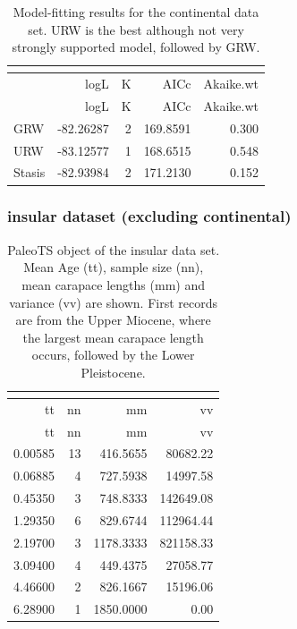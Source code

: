 \begin{longtable}[]{@{}lrrrr@{}}
	\caption[Model fits for continental data set]{Model-fitting results for the continental data set. URW is the best although not very strongly supported model, followed by GRW.}
	\label{tab:pTSCEM}\tabularnewline
	\toprule
	& logL & K & AICc & Akaike.wt\tabularnewline
	\midrule
	\endfirsthead
	\toprule
	& logL & K & AICc & Akaike.wt\tabularnewline
	\midrule
	\endhead
	GRW & -82.26287 & 2 & 169.8591 & 0.300\tabularnewline
	URW & -83.12577 & 1 & 168.6515 & 0.548\tabularnewline
	Stasis & -82.93984 & 2 & 171.2130 & 0.152\tabularnewline
	\bottomrule
\end{longtable}


\FloatBarrier

\subsubsection{insular dataset (excluding
	continental)}\label{insular-excluding-continental}

\begin{longtable}[]{@{}rrrr@{}}
	\caption[PaleoTS object of insular \T]{PaleoTS object of the insular data set. Mean Age (tt), sample size (nn), mean carapace lengths (mm) and variance (vv) are shown. First records are from the Upper Miocene, where the largest mean carapace length occurs, followed by the Lower Pleistocene.}
	\label{tab:pTSI}\tabularnewline
	\toprule
	tt & nn & mm & vv\tabularnewline
	\midrule
	\endfirsthead
	\toprule
	tt & nn & mm & vv\tabularnewline
	\midrule
	\endhead
	0.00585 & 13 & 416.5655 & 80682.22\tabularnewline
	0.06885 & 4 & 727.5938 & 14997.58\tabularnewline
	0.45350 & 3 & 748.8333 & 142649.08\tabularnewline
	1.29350 & 6 & 829.6744 & 112964.44\tabularnewline
	2.19700 & 3 & 1178.3333 & 821158.33\tabularnewline
	3.09400 & 4 & 449.4375 & 27058.77\tabularnewline
	4.46600 & 2 & 826.1667 & 15196.06\tabularnewline
	6.28900 & 1 & 1850.0000 & 0.00\tabularnewline
	\bottomrule
\end{longtable}

